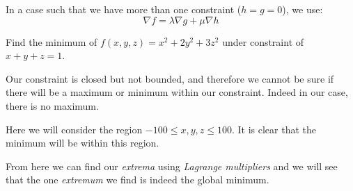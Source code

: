 \documentclass[00_complete]{subfiles}
\begin{document}
In a case such that we have more than one constraint ($h=g=0$), we use:
$$\nabla f = \lambda \nabla g + \mu \nabla h$$
\begin{example}
    Find the minimum of $f(x,y,z)=x^2+2y^2+3z^2$ under constraint of $x+y+z=1$.

    Our constraint is closed but not bounded, and therefore we cannot be sure
    if there will be a maximum or minimum within our constraint. Indeed in our
    case, there is no maximum.

    Here we will consider the region $-100 \leq x,y,z \leq 100$. It is clear
    that the minimum will be within this region.

    From here we can find our \emph{extrema} using \emph{Lagrange multipliers}
    and we will see that the one \emph{extremum} we find is indeed the global
    minimum.
\end{example}
\end{document}
